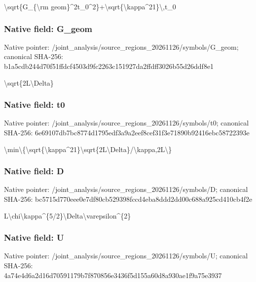 \documentclass[10pt,a4paper]{article}
\begin{document}
\textbackslash{}sqrt\{G\_\{\textbackslash{}rm geom\}\textasciicircum{}2t\_0\textasciicircum{}2\}+\textbackslash{}sqrt\{\textbackslash{}kappa\textasciicircum{}21\}\textbackslash{},t\_0


\subsubsection{Native field: G\_geom}


Native pointer: /joint\_analysis/source\_r\allowbreak{}egions\_20261126/symbols/\allowbreak{}G\_geom; canonical SHA-256: b1a5cdb244d70f51ffdcf450\allowbreak{}3d9fc2263c151927da2ffdff\allowbreak{}3026b55d26ddf8e1


\textbackslash{}sqrt\{2L\textbackslash{}Delta\}


\subsubsection{Native field: t0}


Native pointer: /joint\_analysis/source\_r\allowbreak{}egions\_20261126/symbols/\allowbreak{}t0; canonical SHA-256: 6e69107db7bc8774d1795edf\allowbreak{}3a9a2eef8cef31f3e71890b9\allowbreak{}2416ebc58722393e


\textbackslash{}min\textbackslash{}\{\textbackslash{}sqrt\{\textbackslash{}kappa\textasciicircum{}21\}\textbackslash{}\allowbreak{}sqrt\{2L\textbackslash{}Delta\}/\textbackslash{}kappa,2L\allowbreak{}\textbackslash{}\}


\subsubsection{Native field: D}


Native pointer: /joint\_analysis/source\_r\allowbreak{}egions\_20261126/symbols/\allowbreak{}D; canonical SHA-256: bc5715d770eee0e7df80cb52\allowbreak{}9398fccd4eba8ddd2dd00c68\allowbreak{}8a925cd410cb4f2e


L\textbackslash{}chi\textbackslash{}kappa\textasciicircum{}\{5/2\}\textbackslash{}Delta\textbackslash{}varepsilon\textasciicircum{}\{2\}


\subsubsection{Native field: U}


Native pointer: /joint\_analysis/source\_r\allowbreak{}egions\_20261126/symbols/\allowbreak{}U; canonical SHA-256: 4a74e4d6a2d16d70591179b7\allowbreak{}f870856e3436f5d155a60d8a\allowbreak{}930ae1f9a75e3937
\end{document}
